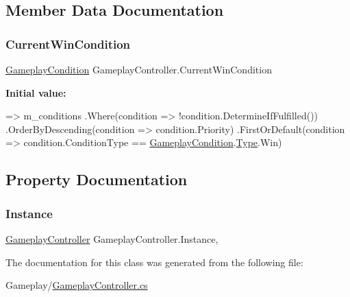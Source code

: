 \subsection{Member Data Documentation}
\mbox{\label{class_gameplay_controller_ad705d003de8ec360b4c215e244f6b3d0}} 
\subsubsection{\texorpdfstring{Current\+Win\+Condition}{CurrentWinCondition}}
{\footnotesize\ttfamily \mbox{\hyperlink{class_gameplay_condition}{Gameplay\+Condition}} Gameplay\+Controller.\+Current\+Win\+Condition}

{\bfseries Initial value\+:}
\begin{DoxyCode}
=> m\_conditions
        .Where(condition => !condition.DetermineIfFulfilled())
        .OrderByDescending(condition => condition.Priority)
        .FirstOrDefault(condition => condition.ConditionType == 
      \mbox{\hyperlink{class_gameplay_condition}{GameplayCondition}}.\mbox{\hyperlink{class_gameplay_condition_af7549fe9ce5328062dab831d05ca9702}{Type}}.Win)
\end{DoxyCode}


\subsection{Property Documentation}
\mbox{\label{class_gameplay_controller_a0bb024792ce1b463dbcba91fc99b7533}} 
\subsubsection{\texorpdfstring{Instance}{Instance}}
{\footnotesize\ttfamily \mbox{\hyperlink{class_gameplay_controller}{Gameplay\+Controller}} Gameplay\+Controller.\+Instance\hspace{0.3cm}{\ttfamily [static]}, {\ttfamily [get]}}



The documentation for this class was generated from the following file\+:\begin{DoxyCompactItemize}
\item 
Gameplay/\mbox{\hyperlink{_gameplay_controller_8cs}{Gameplay\+Controller.\+cs}}\end{DoxyCompactItemize}
